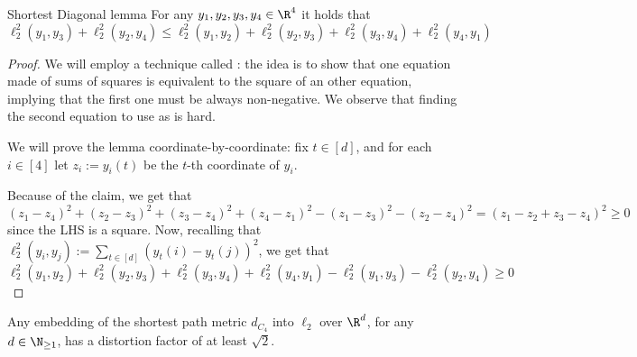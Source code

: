 \documentclass[a4paper, 12pt]{report}
\begin{document}
    \begin{framedlem}{Shortest Diagonal lemma}
        For any $y_1, y_2, y_3, y_4 \in \R^4$ it holds that $$\ell_2^2(y_1, y_3) + \ell_2^2(y_2, y_4) \le \ell_2^2(y_1, y_2) + \ell_2^2(y_2, y_3) + \ell_2^2(y_3, y_4) + \ell_2^2(y_4, y_1)$$
    \end{framedlem}

    \begin{proof}
        We will employ a technique called : the idea is to show that one equation made of sums of squares is equivalent to the square of an other equation, implying that the first one must be always non-negative. We observe that finding the second equation to use as  is  hard.

        We will prove the lemma coordinate-by-coordinate: fix $t \in [d]$, and for each $i \in [4]$ let $z_i := y_i(t)$ be the $t$-th coordinate of $y_i$.


        Because of the claim, we get that $$(z_1 - z_4) ^2 + (z_2 - z_3) ^2 + (z_3 - z_4) ^2 + (z_4 - z_1) ^ 2 - (z_1 - z_3) ^2 - (z_2 - z_4)^2 = (z_1 - z_2 + z_3 - z_4)^2 \ge 0$$ since the LHS is a square. Now, recalling that $\ell_2^2(y_i, y_j) := \sum_{t \in [d]}{(y_t(i) - y_t(j))^2}$, we get that $$\ell_2^2(y_1, y_2) + \ell_2^2(y_2, y_3) + \ell_2^2(y_3, y_4) + \ell_2^2(y_4, y_1) - \ell_2^2(y_1, y_3) - \ell_2^2(y_2, y_4) \ge 0$$
    \end{proof}

    \begin{framedprop}{}
        Any embedding of the shortest path metric $d_{C_4}$ into $\ell_2$ over $\R^d$, for any $d \in \N_{\ge 1}$, has a distortion factor of at least $\sqrt 2$.
    \end{framedprop}
\end{document}
